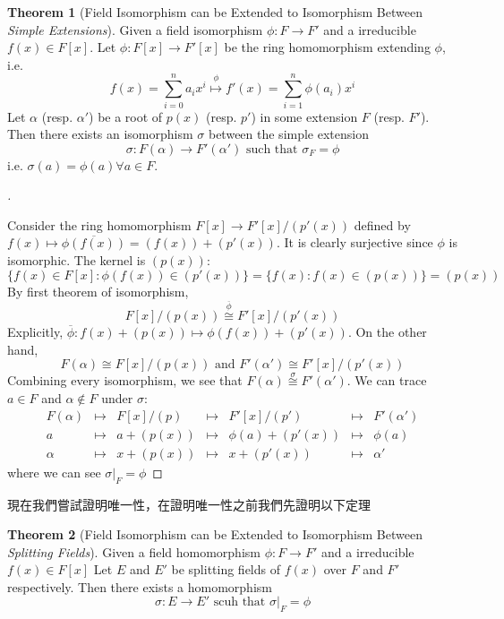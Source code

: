 \documentclass{article}
\theoremstyle{definition}
\newtheorem{thm}{Theorem}
\newenvironment{proofs}[1][\proofname]{%
  \begin{proof}[#1]$ $\par\nobreak\ignorespaces
}{%
  \end{proof}
}
\begin{document}
\begin{thm}[Field Isomorphism can be Extended to Isomorphism Between \textit{Simple Extensions}]
	Given a field isomorphism $\phi:F\to F'$ and a irreducible $f(x)\in F[x]$. Let ${\phi}:F[x]\to F'[x]$ be the ring homomorphism extending $\phi$, i.e.
	\[f(x)=\sum_{i=0}^n a_i x^i \overset{{\phi}}{\mapsto} f'(x)=\sum_{i=1}^n \phi(a_i) x^i\]
	Let $\alpha$ (resp. $\alpha'$) be a root of $p(x)$ (resp. $p'$) in some extension $F$ (resp. $F'$). Then there exists an isomorphism $\sigma$ between the simple extension
	\[\sigma:F(\alpha)\to F'(\alpha')\text{ such that } \sigma_F=\phi\]
	i.e. $\sigma(a)=\phi(a) \forall a \in F$.
\end{thm}

\begin{proofs}
	Consider the ring homomorphism $F[x]\to F'[x]/(p'(x))$ defined by $f(x)\mapsto \overline{\phi(f(x))}=(f(x))+(p'(x))$. It is clearly surjective since $\phi$ is isomorphic. The kernel is $(p(x))$:
	\[\{f(x)\in F[x]: \phi(f(x))\in (p'(x))\}=\{f(x): f(x)\in (p(x))\}=(p(x))\]
	By first theorem of isomorphism, 
	\[F[x]/(p(x))\overset{\overline{\phi}}{\cong} F'[x]/(p'(x))\]
	Explicitly, $\overline{\phi}: f(x)+(p(x))\mapsto \phi(f(x))+(p'(x))$. On the other hand,
	\[F(\alpha)\cong F[x]/(p(x)) \text{ and } F'(\alpha')\cong F'[x]/(p'(x))\]
	Combining every isomorphism, we see that $F(\alpha)\overset{\sigma}{\cong}F'(\alpha')$. 
	We can trace $a\in F$ and $\alpha \notin F$ under $\sigma$:
	\[\begin{matrix}
		F(\alpha) &\mapsto& F[x]/(p)&\mapsto& F'[x]/(p') &\mapsto& F'(\alpha') \\
		a &\mapsto& a+(p(x))&\mapsto& \phi(a) + (p'(x)) &\mapsto& \phi(a) \\
		\alpha &\mapsto& x+(p(x))&\mapsto& x + (p'(x)) &\mapsto& \alpha'
	\end{matrix} \]
	where we can see $\sigma|_F=\phi$
\end{proofs}

現在我們嘗試證明唯一性，在證明唯一性之前我們先證明以下定理
\begin{thm}[Field Isomorphism can be Extended to Isomorphism Between \textit{Splitting Fields}]
	Given a field homomorphism $\phi:F\to F'$ and a irreducible $f(x)\in F[x]$
	Let $E$ and $E'$ be splitting fields of $f(x)$ over $F$ and $F'$ respectively. Then there exists a homomorphism 
	\[\sigma:E\to E' \text{ scuh that }\sigma|_F=\phi\]
	
\end{thm}
\end{document}
